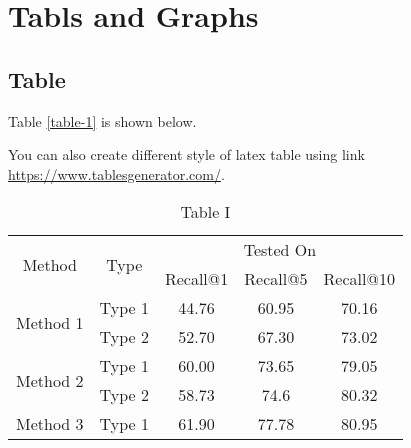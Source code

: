 \chapter{Tabls and Graphs}
\label{sec-pslen}



\section{Table}
Table \ref{table-1} is shown below.

You can also create different style of latex table using link \url{https://www.tablesgenerator.com/}.
\begin{table*}[h]
	\caption{Table I}
	\centering
	\renewcommand{\arraystretch}{1.2}%
	\begin{tabular}{|c|c|c|c|c|}
		\hline
		\multirow{2}{*}{Method}                                   & \multirow{2}{*}{Type} & \multicolumn{3}{c|}{Tested On}                                                                  \\ \cline{3-5}

		                                                          &                       & \multicolumn{1}{c|}{Recall@1}  & \multicolumn{1}{c|}{Recall@5} & \multicolumn{1}{c|}{Recall@10} \\
		\hline
		\hline
		\multirow{2}{*}{Method 1}                                 & Type 1                & 44.76                          & 60.95                         & 70.16                          \\

		                                                          & Type 2                & 52.70                          & 67.30                         & 73.02                          \\
		\hline
		\multirow{2}{*}{Method 2 \cite{arandjelovic2016netvlad} } & Type 1                & 60.00                          & 73.65                         & 79.05                          \\

		                                                          & Type 2                & 58.73                          & 74.6                          & 80.32                          \\
		\hline
		\multirow{2}{*}{Method 3 \cite{zhu2018attention} }        & Type 1                & 61.90                          & 77.78                         & 80.95                          \\


\end{tabular}
\end{table*}
